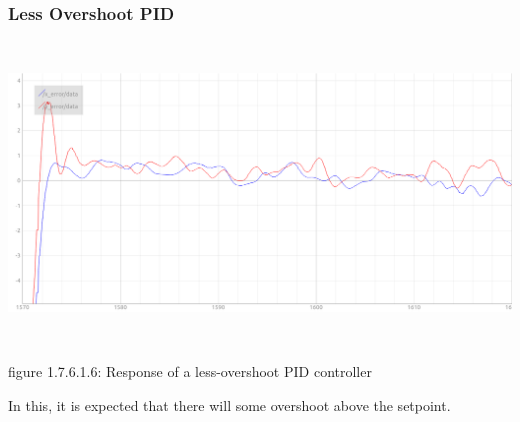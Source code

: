 \documentclass[a4paper,12pt,oneside]{book}
\begin{document}
\subsubsection{Less Overshoot PID}
\begin{flushleft}
\includegraphics[width = 15cm , height= 8cm]{less-overshoot-pid.png}
\begin{center}
    figure 1.7.6.1.6: Response of a less-overshoot PID controller
\end{center}
In this, it is expected that there will some overshoot above the setpoint.
\end{flushleft}
 
\end{document}
